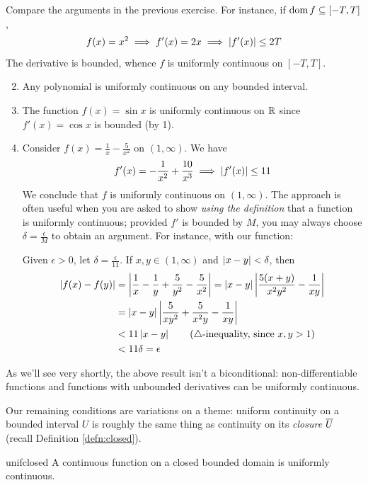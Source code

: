 \begin{examples}{}{}
	\exstart Compare the arguments in the previous exercise. For instance, if $\operatorname{dom} f\subseteq[-T,T]$,
	\[f(x)=x^2\implies f'(x)=2x\implies \left| f'(x)\right|\le 2T\]
	The derivative is bounded, whence $f$ is uniformly continuous on $[-T,T]$.
	\begin{enumerate}\setcounter{enumi}{1}
	  \item Any polynomial is uniformly continuous on any bounded interval.
	  \item The function $f(x)=\sin x$ is uniformly continuous on $\mathbb{R}$ since $f'(x)=\cos x$ is bounded (by 1).
	  \item Consider $f(x)=\frac 1x-\frac 5{x^2}$ on $(1,\infty)$. We have
	  \[
	  	f'(x)=-\frac 1{x^2}+\frac{10}{x^3}\implies \left| f'(x)\right|\le 11
	  \]
	  We conclude that $f$ is uniformly continuous on $(1,\infty)$.\smallbreak
	  The approach is often useful when you are asked to show \emph{using the definition} that a function is uniformly continuous; provided $f'$ is bounded by $M$, you may always choose $\delta=\frac\epsilon M$ to obtain an argument. For instance, with our function:\par
	  Given $\epsilon>0$, let $\delta=\frac\epsilon{11}$. If $x,y\in(1,\infty)$ and $\left| x-y\right|<\delta$, then
	  \begin{align*}
	  	\left| f(x)-f(y)\right| &=\left| \frac 1x-\frac 1y+\frac 5{y^2}-\frac 5{x^2}\right| = \left| x-y\right|\left| \frac{5(x+y)}{x^2y^2}-\frac 1{xy}\right|\\
	  	&=\left| x-y\right|\left| \frac 5{xy^2}+\frac 5{x^2y}-\frac 1{xy}\right|\\
	  	&< 11\left| x-y\right| \tag{$\triangle$-inequality, since $x,y>1$}\\
	  	&<11\delta=\epsilon
	  \end{align*}
	\end{enumerate}
\end{examples}

As we'll see very shortly, the above result isn't a biconditional: non-differentiable functions and functions with unbounded derivatives can be uniformly continuous.

\goodbreak

Our remaining conditions are variations on a theme: uniform continuity on a bounded interval $U$ is roughly the same thing as continuity on its \emph{closure} $\overline{U}$ (recall Definition \ref{defn:closed}). 

\begin{thm}{}{unifclosed}
	A continuous function on a closed bounded domain is uniformly continuous.
\end{thm}

